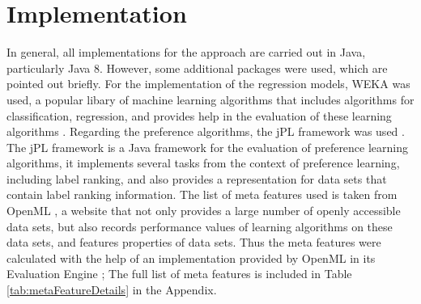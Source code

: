 \section{Implementation}
In general, all implementations for the approach are carried out in Java, particularly Java 8. However, some additional packages were used, which are pointed out briefly. For the implementation of the regression models, WEKA was used, a popular libary of machine learning algorithms that includes algorithms for classification, regression, and provides help in the evaluation of these learning algorithms \cite{hall2009weka}. Regarding the preference algorithms, the jPL framework was used \cite{intelligent2017jpl}. The jPL framework is a Java framework for the evaluation of preference learning algorithms, it implements several tasks from the context of preference learning, including label ranking, and also provides a representation for data sets that contain label ranking information. The list of meta features used is taken from OpenML \cite{OpenML2013}, a website that not only provides a large number of openly accessible data sets, but also records performance values of learning algorithms on these data sets, and features properties of data sets. Thus the meta features were calculated with the help of an implementation provided by OpenML in its Evaluation Engine \cite{openMLEvaluationEngine}; The full list of meta features is included in Table \ref{tab:metaFeatureDetails} in the Appendix.